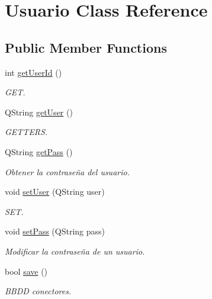 \hypertarget{classUsuario}{}\section{Usuario Class Reference}
\label{classUsuario}
\subsection*{Public Member Functions}
\begin{DoxyCompactItemize}
\item 
\mbox{\label{classUsuario_a074a24d385ccca50f34b20840c6d6493}} 
int \mbox{\hyperlink{classUsuario_a074a24d385ccca50f34b20840c6d6493}{get\+User\+Id}} ()
\begin{DoxyCompactList}\small\item\em G\+ET. \end{DoxyCompactList}\item 
Q\+String \mbox{\hyperlink{classUsuario_a26932183472124e9054d95c534e6f7e9}{get\+User}} ()
\begin{DoxyCompactList}\small\item\em G\+E\+T\+T\+E\+RS. \end{DoxyCompactList}\item 
Q\+String \mbox{\hyperlink{classUsuario_ae00ae9ee09459165c7b7ecb060ff7071}{get\+Pass}} ()
\begin{DoxyCompactList}\small\item\em Obtener la contraseña del usuario. \end{DoxyCompactList}\item 
void \mbox{\hyperlink{classUsuario_a7418cbad332fa68f0803f2449f304251}{set\+User}} (Q\+String user)
\begin{DoxyCompactList}\small\item\em S\+ET. \end{DoxyCompactList}\item 
void \mbox{\hyperlink{classUsuario_aa13faa50f1b4226f0c0d400911fa7c34}{set\+Pass}} (Q\+String pass)
\begin{DoxyCompactList}\small\item\em Modificar la contraseña de un usuario. \end{DoxyCompactList}\item 
bool \mbox{\hyperlink{classUsuario_aa6274c43296b3fa971b5560c8a448441}{save}} ()
\begin{DoxyCompactList}\small\item\em B\+B\+DD conectores. \end{DoxyCompactList}\item 

\end{DoxyCompactItemize}
